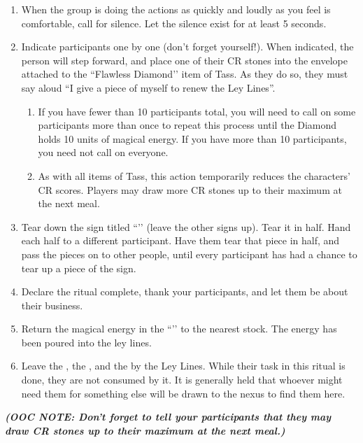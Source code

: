 \documentclass[green]{GL2020}
\begin{document}
\begin{enumerate}
  \item When the group is doing the actions as quickly and loudly as you feel is comfortable, call for silence. Let the silence exist for at least 5 seconds.
  \item Indicate participants one by one (don’t forget yourself!). When indicated, the person will step forward, and place one of their CR stones into the envelope attached to the ``Flawless Diamond’’ item of Tass. As they do so, they must say aloud “I give a piece of myself to renew the Ley Lines”. 
    \begin{enumerate}
    \item If you have fewer than 10 participants total, you will need to call on some participants more than once to repeat this process until the Diamond holds 10 units of magical energy. If you have more than 10 participants, you need not call on everyone.
    \item As with all items of Tass, this action temporarily reduces the characters’ CR scores. Players may draw more CR stones up to their maximum at the next meal.
  \end{enumerate}  
  \item Tear down the sign titled ``\sLeyLinesSad{}’’ (leave the other signs up). Tear it in half. Hand each half to a different participant. Have them tear that piece in half, and pass the pieces on to other people, until every participant has had a chance to tear up a piece of the sign.
  \item Declare the ritual complete, thank your participants, and let them be about their business.
  \item Return the magical energy in the ``\iDiamond{}’’ to the nearest stock. The energy has been poured into the ley lines.
  \item Leave the \iClay{}, the \iObsidian{}, and the \iLimestone{} by the Ley Lines. While their task in this ritual is done, they are not consumed by it. It is generally held that whoever might need them for something else will be drawn to the nexus to find them here.
\end{enumerate}

\emph{\textbf{(OOC NOTE: Don’t forget to tell your participants that they may draw CR stones up to their maximum at the next meal.)}}
\end{document}
